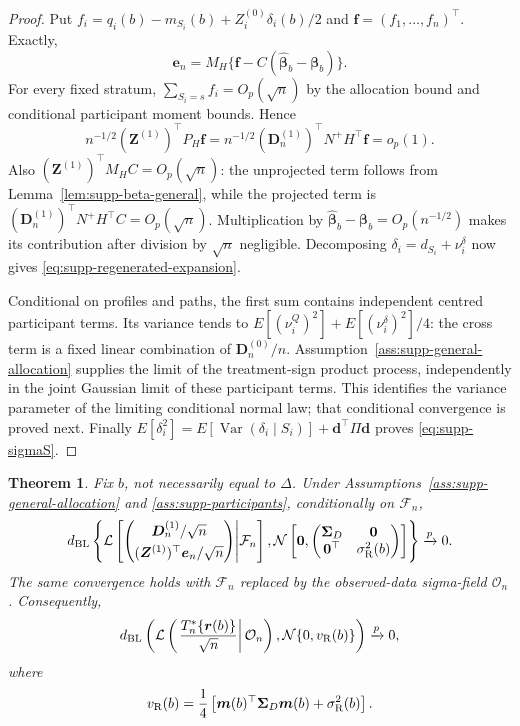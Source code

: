 \documentclass[12pt,a4paper]{article}
\newtheorem{theorem}{Theorem}
\theoremstyle{definition}
\theoremstyle{remark}\newtheorem{remark}{Remark}
\numberwithin{equation}{section}
\begin{document}
\begin{proof}
Put $f_i=q_i(b)-m_{S_i}(b)+Z_i^{(0)}\delta_i(b)/2$ and $\bm f=(f_1,\ldots,f_n)^\top$. Exactly,
\[
 \bm e_n=M_H\{\bm f-C(\widehat{\bm\beta}_b-\bm\beta_b)\}.
\]
For every fixed stratum, $\sum_{S_i=s}f_i=O_p(\sqrt n)$ by the allocation bound and conditional participant moment bounds. Hence
\[
 n^{-1/2}(\bm Z^{(1)})^\top P_H\bm f
 =n^{-1/2}(\bm D_n^{(1)})^\top N^+H^\top\bm f=o_p(1).
\]
Also $(\bm Z^{(1)})^\top M_H C=O_p(\sqrt n)$: the unprojected term follows from Lemma~\ref{lem:supp-beta-general}, while the projected term is $(\bm D_n^{(1)})^\top N^+H^\top C=O_p(\sqrt n)$. Multiplication by $\widehat{\bm\beta}_b-\bm\beta_b=O_p(n^{-1/2})$ makes its contribution after division by $\sqrt n$ negligible. Decomposing $\delta_i=d_{S_i}+\nu_i^\delta$ now gives \eqref{eq:supp-regenerated-expansion}.

Conditional on profiles and paths, the first sum contains independent centred participant terms. Its variance tends to $E[(\nu_i^Q)^2]+E[(\nu_i^\delta)^2]/4$: the cross term is a fixed linear combination of $\bm D_n^{(0)}/n$. Assumption~\ref{ass:supp-general-allocation} supplies the limit of the treatment-sign product process, independently in the joint Gaussian limit of these participant terms. This identifies the variance parameter of the limiting conditional normal law; that conditional convergence is proved next. Finally $E[\delta_i^2]=E[\operatorname{Var}(\delta_i\mid S_i)]+\bm d^\top\Pi\bm d$ proves \eqref{eq:supp-sigmaS}.
\end{proof}

\begin{theorem}\label{thm:supp-conditional-R}
Fix $b$, not necessarily equal to $\Delta$. Under Assumptions~\ref{ass:supp-general-allocation} and \ref{ass:supp-participants}, conditionally on $\mathcal F_n$,
\begin{equation}\label{eq:supp-conditional-R}
d_{\mathrm{BL}}\left\{
\mathcal L\left[
\begin{pmatrix}
\bm D_n^{(1)}/\sqrt n\\[1mm]
(\bm Z^{(1)})^\top\bm e_n/\sqrt n
\end{pmatrix}
\middle|\mathcal F_n
\right],
\mathcal N\left[
\bm0,
\begin{pmatrix}
\bm\Sigma_D&\bm0\\
\bm0^\top&\sigma_{\rm R}^2(b)
\end{pmatrix}
\right]
\right\}
\xrightarrow{p}0.
\end{equation}
The same convergence holds with $\mathcal F_n$ replaced by the observed-data sigma-field $\mathcal O_n$. Consequently,
\begin{equation}\label{eq:supp-vR}
d_{\mathrm{BL}}\left(
\mathcal L\left(
\left.
\frac{T_n^*\{\bm r(b)\}}{\sqrt n}
\right|
\mathcal O_n
\right),
\mathcal N\{0,v_{\rm R}(b)\}
\right)
\xrightarrow{p}0,
\end{equation}
where
\[
v_{\rm R}(b)
=\frac14\left[
\bm m(b)^\top\bm\Sigma_D\bm m(b)
+\sigma_{\rm R}^2(b)
\right].
\]
\end{theorem}
\end{document}
